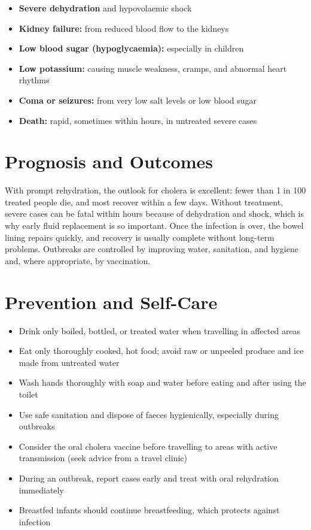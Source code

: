 \begin{itemize}
    \item \textbf{Severe dehydration} and hypovolaemic shock
    \item \textbf{Kidney failure:} from reduced blood flow to the kidneys
    \item \textbf{Low blood sugar (hypoglycaemia):} especially in children
    \item \textbf{Low potassium:} causing muscle weakness, cramps, and abnormal heart rhythms
    \item \textbf{Coma or seizures:} from very low salt levels or low blood sugar
    \item \textbf{Death:} rapid, sometimes within hours, in untreated severe cases
\end{itemize}

\section*{Prognosis and Outcomes}
With prompt rehydration, the outlook for cholera is excellent: fewer than 1 in 100 treated people die, and most recover within a few days. Without treatment, severe cases can be fatal within hours because of dehydration and shock, which is why early fluid replacement is so important. Once the infection is over, the bowel lining repairs quickly, and recovery is usually complete without long-term problems. Outbreaks are controlled by improving water, sanitation, and hygiene and, where appropriate, by vaccination.

\section*{Prevention and Self-Care}
\begin{itemize}
    \item Drink only boiled, bottled, or treated water when travelling in affected areas
    \item Eat only thoroughly cooked, hot food; avoid raw or unpeeled produce and ice made from untreated water
    \item Wash hands thoroughly with soap and water before eating and after using the toilet
    \item Use safe sanitation and dispose of faeces hygienically, especially during outbreaks
    \item Consider the oral cholera vaccine before travelling to areas with active transmission (seek advice from a travel clinic)
    \item During an outbreak, report cases early and treat with oral rehydration immediately
    \item Breastfed infants should continue breastfeeding, which protects against infection
\end{itemize}

